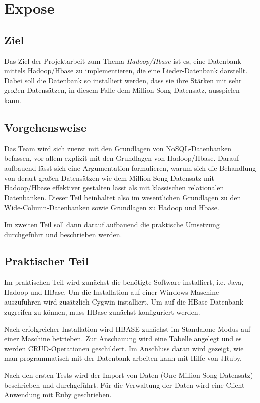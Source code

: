 \chapter{Expose}
\section{Ziel}
Das Ziel der Projektarbeit zum Thema \textit{Hadoop/Hbase} ist es, 
eine Datenbank mittels Hadoop/Hbase zu implementieren, die eine Lieder-Datenbank
darstellt. Dabei soll die Datenbank so installiert werden, dass sie ihre Stärken mit
sehr großen Datensätzen, in diesem Falle dem Million-Song-Datensatz, ausspielen kann.

\section{Vorgehensweise}
Das Team wird sich zuerst mit den Grundlagen von NoSQL-Datenbanken befassen, 
vor allem explizit mit den Grundlagen von Hadoop/Hbase. Darauf aufbauend lässt
sich eine Argumentation formulieren, warum sich die Behandlung von derart großen Datensätzen
wie dem Million-Song-Datensatz mit Hadoop/Hbase effektiver gestalten lässt als mit klassischen relationalen Datenbanken. Dieser Teil beinhaltet also im wesentlichen
Grundlagen zu den Wide-Column-Datenbanken sowie Grundlagen zu Hadoop und Hbase.

Im zweiten Teil soll dann darauf aufbauend die praktische Umsetzung durchgeführt und beschrieben
werden.

\section{Praktischer Teil}
Im praktischen Teil wird zunächst die benötigte Software installiert, i.e. Java, Hadoop und HBase. Um die Installation auf einer Windows-Maschine auszuführen wird zusätzlich Cygwin installiert. Um auf die HBase-Datenbank zugreifen zu können, muss HBase zunächst konfiguriert werden.

Nach erfolgreicher Installation wird HBASE zunächst im Standalone-Modus auf einer Maschine betrieben. Zur Anschauung wird eine Tabelle angelegt und es werden CRUD-Operationen geschildert. Im Anschluss daran wird gezeigt, wie man programmatisch mit der Datenbank arbeiten kann mit Hilfe von JRuby.

Nach den ersten Tests wird der Import von Daten (One-Million-Song-Datensatz) beschrieben und durchgeführt. Für die Verwaltung der Daten wird eine Client-Anwendung mit Ruby geschrieben.

